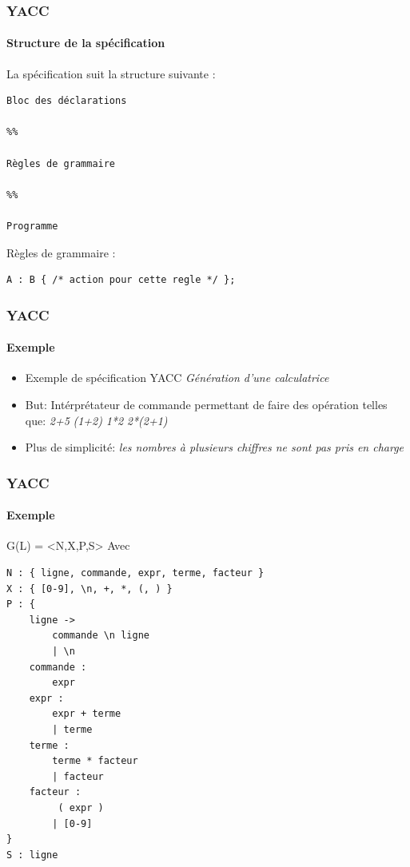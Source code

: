 \documentclass{beamer}
\begin{document}
\begin{frame}[fragile,allowframebreaks=0.98]\frametitle{YACC}\framesubtitle{Structure de la spécification}

La spécification suit la structure suivante :

\begin{Verbatim}[fontsize=\scriptsize,frame=lines]
Bloc des déclarations

%%

Règles de grammaire

%%

Programme
\end{Verbatim}


Règles de grammaire :

\begin{Verbatim}[fontsize=\scriptsize,frame=lines]
A : B { /* action pour cette regle */ };
\end{Verbatim}

\end{frame}

\begin{frame}\frametitle{YACC}\framesubtitle{Exemple}

	\begin{itemize}
		\item Exemple de spécification YACC
				\subitem \textit{Génération d'une calculatrice}\newline
		\item But: Intérprétateur de commande permettant de faire des opération telles que:\newline
				\subitem \textit{2+5}\newline
				\subitem \textit{(1+2)}\newline
				\subitem \textit{1*2}\newline
				\subitem \textit{2*(2+1)}\newline
		\item Plus de simplicité:\newline
				\subitem \textit{les nombres à plusieurs chiffres ne sont pas pris en charge}
	\end{itemize}

\end{frame}

\begin{frame}[fragile,allowframebreaks=0.98]\frametitle{YACC}\framesubtitle{Exemple}

G(L) = <N,X,P,S> Avec
\begin{Verbatim}[fontsize=\scriptsize]
N : { ligne, commande, expr, terme, facteur }
X : { [0-9], \n, +, *, (, ) }
P : {
    ligne -> 		
        commande \n ligne
        | \n
    commande :	
        expr
    expr :		
        expr + terme
        | terme
    terme : 		
        terme * facteur
        | facteur
    facteur : 		
         ( expr )
        | [0-9]
}
S : ligne

\end{Verbatim}

\end{frame}
\end{document}

